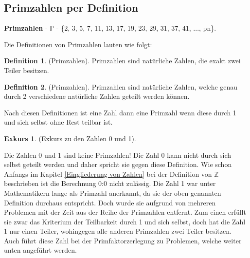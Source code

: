 \documentclass[12pt,a4paper]{article}
\theoremstyle{definition}
\newtheorem{defi}{Definition}[section]
\newtheorem{exkurs}{Exkurs}
\begin{document}
\subsection{Primzahlen per Definition}\label{Primzahlen per Definition}
\textbf{Primzahlen} - $\mathbb{P}$ - \{2, 3, 5, 7, 11, 13, 17, 19, 23, 29, 31, 37, 41, ..., pn\}.

Die Definitionen von Primzahlen lauten wie folgt:
\begin{defi}(Primzahlen).\newline
Primzahlen sind natürliche Zahlen, die exakt zwei Teiler besitzen.
\end{defi}
\begin{defi}(Primzahlen).\newline
Primzahlen sind natürliche Zahlen, welche genau durch 2 verschiedene natürliche Zahlen geteilt werden können.
\end{defi}

Nach diesen Definitionen ist eine Zahl dann eine Primzahl wenn diese durch 1 und sich selbst ohne Rest teilbar ist.
\begin{exkurs}(Exkurs zu den Zahlen 0 und 1).\label{Exkurs zu den Zahlen 0 und 1}
\par\begingroup\leftskip=0.5cm\rightskip=0.5cm\noindent
Die Zahlen 0 und 1 sind keine Primzahlen!
Die Zahl 0 kann nicht durch sich selbst geteilt werden und daher spricht sie gegen diese Definition.
Wie schon Anfangs im Kapitel \ref{Eingliederung von Zahlen} bei der Definition von $\mathbb{Z}$ beschrieben ist die Berechnung 0:0 nicht zulässig.\newline
Die Zahl 1 war unter Mathematikern lange als Primzahl anerkannt, da sie der oben genannten Definition durchaus entspricht.
Doch wurde sie aufgrund von mehreren Problemen mit der Zeit aus der Reihe der Primzahlen entfernt.
Zum einen erfüllt sie zwar das Kriterium der Teilbarkeit durch 1 und sich selbst, doch hat die Zahl 1 nur einen Teiler, wohingegen alle anderen Primzahlen zwei Teiler besitzen.
Auch führt diese Zahl bei der Primfaktorzerlegung zu Problemen, welche weiter unten angeführt werden.
\par
\endgroup
\end{exkurs}
\end{document}
